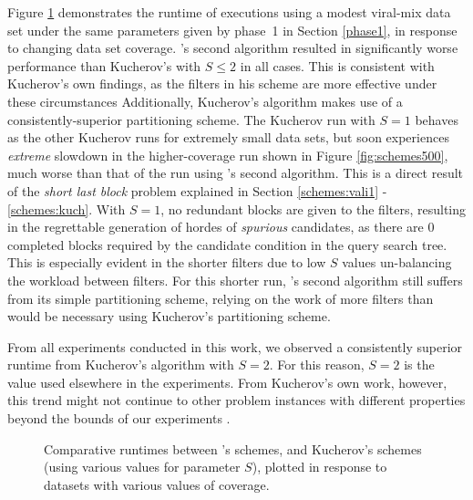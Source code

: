 Figure \ref{fig:schemes} demonstrates the runtime of executions using a modest viral-mix data set under the same parameters given by phase~1 in Section \ref{phase1}, in response to changing data set \gls{coverage}. \vali{}'s second algorithm resulted in significantly worse performance than Kucherov's with $S\leq{}2$ in all cases. This is consistent with Kucherov's own findings, as the \glspl{filter} in his scheme are more effective under these circumstances Additionally, Kucherov's algorithm makes use of a consistently-superior \gls{partitioning scheme}. The Kucherov run with $S=1$ behaves as the other Kucherov runs for extremely small data sets, but soon experiences \textit{extreme} slowdown in the higher-coverage run shown in Figure \ref{fig:schemes500}, much worse than that of the run using \vali{}'s second algorithm. This is a direct result of the \textit{short last block} problem explained in Section \ref{schemes:vali1} - \ref{schemes:kuch}. With $S=1$, no redundant blocks are given to the filters, resulting in the regrettable generation of hordes of \textit{spurious} \glspl{candidate}, as there are 0 completed blocks required by the \gls{candidate condition} in the \gls{query} search tree. This is especially evident in the shorter filters due to low $S$ values un-balancing the workload between filters. For this shorter run, \vali{}'s second algorithm still suffers  from its simple \gls{partitioning scheme}, relying on the work of more filters than would be necessary using Kucherov's partitioning scheme.

From all experiments conducted in this work, we observed a consistently superior runtime from Kucherov's algorithm with $S=2$. For this reason, $S=2$ is the value used elsewhere in the experiments. From Kucherov's own work, however, this trend might not continue to other problem instances with different properties beyond the bounds of our experiments \cite{kuch2014}.

\begin{figure}[!htb]
\centering
{}
\caption{Comparative runtimes between \vali{}'s schemes, and Kucherov's schemes (using various values for parameter $S$), plotted in response to datasets with various values of coverage.}
\label{fig:schemes}
\end{figure}



